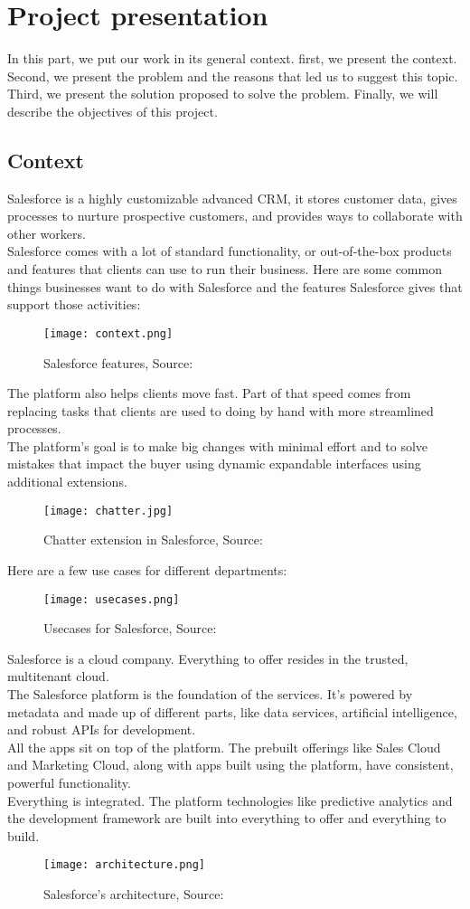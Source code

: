 \section{Project presentation}
In this part, we put our work in its general context.
first, we present the context. Second, we present the problem and the reasons that led
us to suggest this topic. Third, we present the solution
proposed to solve the problem. Finally, we will describe the objectives
of this project.
\subsection{Context}
Salesforce is a highly customizable advanced CRM, it stores customer data, gives processes to nurture prospective customers, and provides ways to collaborate with other workers. \cite{1} \\
Salesforce comes with a lot of standard functionality, or out-of-the-box products and features that clients can use to run their business. Here are some common things businesses want to do with Salesforce and the features Salesforce gives that support those activities:\cite{1}
\begin{figure}[H]%
    \center   
    \texttt{[image: context.png]}
    \caption{Salesforce features, Source: \cite{1}}
\end{figure}
The platform also helps clients move fast. Part of that speed comes from replacing tasks that clients are used to doing by hand with more streamlined processes.\cite{2}\\
The platform's goal is to make big changes with minimal effort and to solve mistakes that impact the buyer using dynamic expandable interfaces using additional extensions.
\begin{figure}[H]%
    \center   
    \texttt{[image: chatter.jpg]}
    \caption{Chatter extension in Salesforce, Source: \cite{2}}
\end{figure}
\newpage
Here are a few use cases for different departments:
\begin{figure}[H]%
    \center   
    \texttt{[image: usecases.png]}
    \caption{Usecases for Salesforce, Source: \cite{2}}
\end{figure}
Salesforce is a cloud company. Everything to offer resides in the trusted, multitenant cloud.\cite{3} \\
The Salesforce platform is the foundation of the services. It’s powered by metadata and made up of different parts, like data services, artificial intelligence, and robust APIs for development. \cite{3} \\
All the apps sit on top of the platform. The prebuilt offerings like Sales Cloud and Marketing Cloud, along with apps built using the platform, have consistent, powerful functionality.\cite{3} \\
Everything is integrated. The platform technologies like predictive analytics and the development framework are built into everything to offer and everything to build.\cite{3} 
\begin{figure}[H]%
    \center   
    \texttt{[image: architecture.png]}
    \caption{Salesforce's architecture, Source: \cite{3}}
\end{figure}

